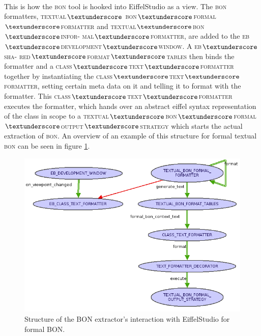 \paragraph{}
This is how the \textsc{bon} tool is hooked into EiffelStudio as a view. The \textsc{bon} formatters, \textsc{textual$\textunderscore$ bon$\textunderscore$formal$\textunderscore$formatter} and \textsc{textual$\textunderscore$bon$\textunderscore$infor- mal$\textunderscore$formatter}, are added to the \textsc{eb$\textunderscore$development$\textunderscore$window}. A \textsc{eb$\textunderscore$sha- red$\textunderscore$format$\textunderscore$tables} then binds the formatter and a \textsc{class$\textunderscore$text$\textunderscore$formatter} together by instantiating the \textsc{class$\textunderscore$text$\textunderscore$formatter}, setting certain meta data on it and telling it to format with the formatter. This \textsc{class$\textunderscore$text$\textunderscore$formatter} executes the formatter, which hands over an abstract eiffel syntax representation of the class in scope to a \textsc{textual$\textunderscore$bon$\textunderscore$formal$\textunderscore$output$\textunderscore$strategy} which starts the actual extraction of \textsc{bon}. An overview of  an example of this structure for formal textual \textsc{bon} can be seen in figure \ref{fig:extractor_structure}.
\begin{figure}[h]
\centerline{
\includegraphics[scale=0.7]{images/BON-extractor-structure-large.png}
}
\caption{Structure of the BON extractor's interaction with EiffelStudio for formal BON.}
\label{fig:extractor_structure}
\end{figure}